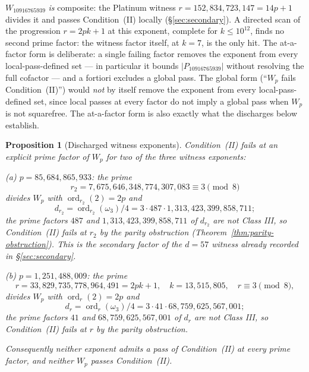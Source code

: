 \documentclass[11pt]{amsart}
\theoremstyle{plain}
\newtheorem{proposition}[theorem]{Proposition}
\theoremstyle{definition}
\theoremstyle{remark}
\numberwithin{equation}{section}
\newcommand{\ord}{\operatorname{ord}}
\begin{document}
$W_{10916765939}$ \emph{is} composite: the Platinum witness $r = 152{,}834{,}723{,}147 = 14 p + 1$ divides it and passes Condition~(II) locally (\S\ref{sec:secondary}). A directed scan of the progression $r = 2 p k + 1$ at this exponent, complete for $k \leq 10^{12}$, finds no second prime factor: the witness factor itself, at $k = 7$, is the only hit. The at-a-factor form is deliberate: a single failing factor removes the exponent from every local-pass-defined set --- in particular it bounds $|P_{10916765939}|$ without resolving the full cofactor --- and a fortiori excludes a global pass. The global form (``$W_{p}$ fails Condition~(II)'') would \emph{not} by itself remove the exponent from every local-pass-defined set, since local passes at every factor do not imply a global pass when $W_p$ is not squarefree. The at-a-factor form is also exactly what the discharges below establish.

\begin{proposition}[Discharged witness exponents]\label{prop:witness-discharges}
Condition~(II) fails at an explicit prime factor of $W_p$ for two of the three witness exponents:

(a) $p = 85{,}684{,}865{,}933$: the prime
\[
  r_2 = 7{,}675{,}646{,}348{,}774{,}307{,}083 \equiv 3 \pmod 8
\]
divides $W_p$ with $\ord_{r_2}(2) = 2p$ and
\[
  d_{r_2} = \ord_{r_2}(\omega_3)/4 = 3 \cdot 487 \cdot 1{,}313{,}423{,}399{,}858{,}711;
\]
the prime factors $487$ and $1{,}313{,}423{,}399{,}858{,}711$ of $d_{r_2}$ are not Class III, so Condition~(II) fails at $r_2$ by the parity obstruction (Theorem~\ref{thm:parity-obstruction}). This is the secondary factor of the $d = 57$ witness already recorded in \S\ref{sec:secondary}.

(b) $p = 1{,}251{,}488{,}009$: the prime
\[
  r = 33{,}829{,}735{,}778{,}964{,}491 = 2 p k + 1, \quad k = 13{,}515{,}805, \quad r \equiv 3 \pmod 8,
\]
divides $W_p$ with $\ord_r(2) = 2p$ and
\[
  d_r = \ord_r(\omega_3)/4 = 3 \cdot 41 \cdot 68{,}759{,}625{,}567{,}001;
\]
the prime factors $41$ and $68{,}759{,}625{,}567{,}001$ of $d_r$ are not Class III, so Condition~(II) fails at $r$ by the parity obstruction.

Consequently neither exponent admits a pass of Condition~(II) at every prime factor, and neither $W_p$ passes Condition~(II).
\end{proposition}
\end{document}
